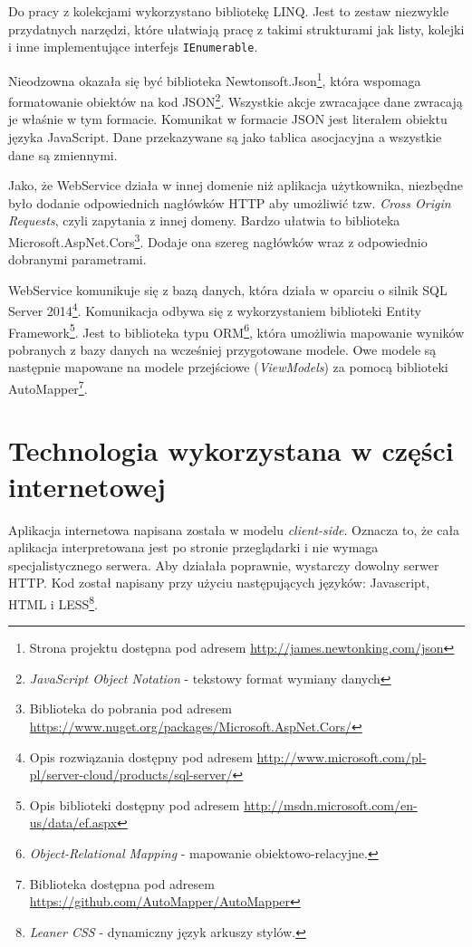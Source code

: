 \documentclass{book}
\begin{document}
		Do pracy z kolekcjami wykorzystano bibliotekę LINQ. Jest to zestaw niezwykle przydatnych narzędzi, które ułatwiają pracę z takimi strukturami jak listy, kolejki i inne implementujące interfejs \texttt{IEnumerable}.
		
		Nieodzowna okazała się być biblioteka Newtonsoft.Json\footnote{Strona projektu dostępna pod adresem \url{http://james.newtonking.com/json}}, która wspomaga formatowanie obiektów na kod JSON\footnote{\emph{JavaScript Object Notation} - tekstowy format wymiany danych}. Wszystkie akcje zwracające dane zwracają je właśnie w tym formacie. Komunikat w formacie JSON jest literałem obiektu języka JavaScript. Dane przekazywane są jako tablica asocjacyjna a wszystkie dane są zmiennymi.
		
		Jako, że WebService działa w innej domenie niż aplikacja użytkownika, niezbędne było dodanie odpowiednich nagłówków HTTP aby umożliwić tzw. \emph{Cross Origin Requests}, czyli zapytania z innej domeny. Bardzo ułatwia to biblioteka Microsoft.AspNet.Cors\footnote{Biblioteka do pobrania pod adresem \url{https://www.nuget.org/packages/Microsoft.AspNet.Cors/}}. Dodaje ona szereg nagłówków wraz z odpowiednio dobranymi parametrami.
		
		WebService komunikuje się z bazą danych, która działa w oparciu o silnik SQL Server 2014\footnote{Opis rozwiązania dostępny pod adresem \url{http://www.microsoft.com/pl-pl/server-cloud/products/sql-server/}}. Komunikacja odbywa się z wykorzystaniem biblioteki Entity Framework\footnote{Opis biblioteki dostępny pod adresem \url{http://msdn.microsoft.com/en-us/data/ef.aspx}}. Jest to biblioteka typu ORM\footnote{\emph{Object-Relational Mapping} - mapowanie obiektowo-relacyjne. },
		która umożliwia mapowanie wyników pobranych z bazy danych na wcześniej przygotowane modele. Owe modele są następnie mapowane na modele przejściowe (\emph{ViewModels}) za pomocą biblioteki AutoMapper\footnote{Biblioteka dostępna pod adresem \url{https://github.com/AutoMapper/AutoMapper}}.
		
		\section{Technologia wykorzystana w części internetowej} 
			
		Aplikacja internetowa napisana została w modelu \emph{client-side}. Oznacza to, że cała aplikacja interpretowana jest po stronie przeglądarki i nie wymaga specjalistycznego serwera. Aby działała poprawnie, wystarczy dowolny serwer HTTP. Kod został napisany przy użyciu następujących języków: Javascript, HTML i LESS\footnote{\emph{Leaner CSS} - dynamiczny język arkuszy stylów.}. 
		
\end{document}
